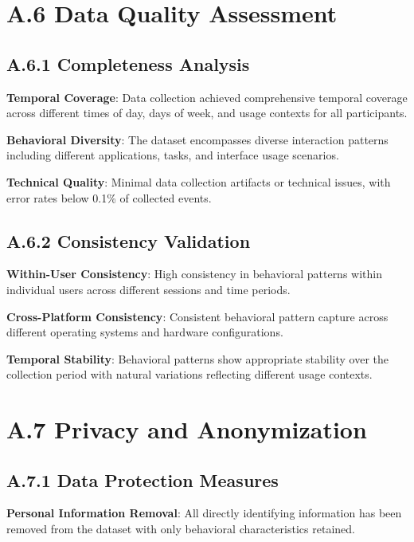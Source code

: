\documentclass[
  12pt,
  a4paper,
]{report}
\begin{document}
\section{A.6 Data Quality Assessment}\label{a.6-data-quality-assessment}

\subsection{A.6.1 Completeness
Analysis}\label{a.6.1-completeness-analysis}

\textbf{Temporal Coverage}: Data collection achieved comprehensive
temporal coverage across different times of day, days of week, and usage
contexts for all participants.

\textbf{Behavioral Diversity}: The dataset encompasses diverse
interaction patterns including different applications, tasks, and
interface usage scenarios.

\textbf{Technical Quality}: Minimal data collection artifacts or
technical issues, with error rates below 0.1\% of collected events.

\subsection{A.6.2 Consistency
Validation}\label{a.6.2-consistency-validation}

\textbf{Within-User Consistency}: High consistency in behavioral
patterns within individual users across different sessions and time
periods.

\textbf{Cross-Platform Consistency}: Consistent behavioral pattern
capture across different operating systems and hardware configurations.

\textbf{Temporal Stability}: Behavioral patterns show appropriate
stability over the collection period with natural variations reflecting
different usage contexts.

\section{A.7 Privacy and
Anonymization}\label{a.7-privacy-and-anonymization}

\subsection{A.7.1 Data Protection
Measures}\label{a.7.1-data-protection-measures}

\textbf{Personal Information Removal}: All directly identifying
information has been removed from the dataset with only behavioral
characteristics retained.
\end{document}
